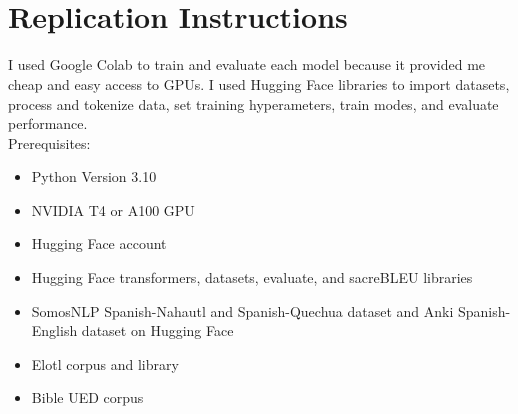 \documentclass[10pt,twocolumn]{article}
\begin{document}
\appendix
\section{\\Replication Instructions}
I used Google Colab to train and evaluate each model because it provided me cheap and easy access to GPUs. I used Hugging Face libraries to import datasets, process and tokenize data, set training hyperameters, train modes, and evaluate performance.\\

Prerequisites:
\begin{itemize}
    \item Python Version 3.10
    \item NVIDIA T4 or A100 GPU
    \item Hugging Face account
    \item Hugging Face transformers, datasets, evaluate, and sacreBLEU libraries
    \item SomosNLP Spanish-Nahautl and Spanish-Quechua dataset and Anki Spanish-English dataset on Hugging Face
    \item Elotl corpus and library
    \item Bible UED corpus \\
    \end{itemize} 
\end{document}
